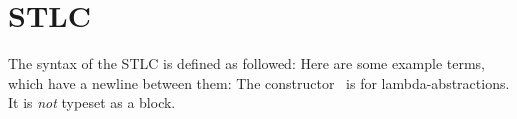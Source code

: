 \documentclass{article}
\begin{document}
  

  \section{STLC}
  The syntax of the STLC is defined as followed:
  \STLCSyntax
  Here are some example terms, which have a newline between them:
  \STLCExamples
  The constructor \STLCEAbs\ is for lambda-abstractions. It is \emph{not} typeset as a block.
\end{document}
